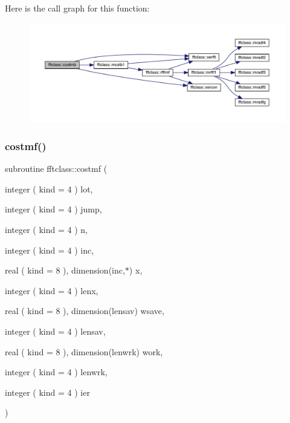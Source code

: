 Here is the call graph for this function\+:\nopagebreak
\begin{figure}[H]
\begin{center}
\leavevmode
\includegraphics[width=350pt]{namespacefftclass_a1bb83e3c96bf08b2789acf52feef22b8_cgraph}
\end{center}
\end{figure}
\mbox{\label{namespacefftclass_a04e4666f4382e42cf8e63ee5c44fc61a}} 
\subsubsection{\texorpdfstring{costmf()}{costmf()}}
{\footnotesize\ttfamily subroutine fftclass\+::costmf (\begin{DoxyParamCaption}\item[{integer ( kind = 4 )}]{lot,  }\item[{integer ( kind = 4 )}]{jump,  }\item[{integer ( kind = 4 )}]{n,  }\item[{integer ( kind = 4 )}]{inc,  }\item[{real ( kind = 8 ), dimension(inc,$\ast$)}]{x,  }\item[{integer ( kind = 4 )}]{lenx,  }\item[{real ( kind = 8 ), dimension(lensav)}]{wsave,  }\item[{integer ( kind = 4 )}]{lensav,  }\item[{real ( kind = 8 ), dimension(lenwrk)}]{work,  }\item[{integer ( kind = 4 )}]{lenwrk,  }\item[{integer ( kind = 4 )}]{ier }\end{DoxyParamCaption})}

